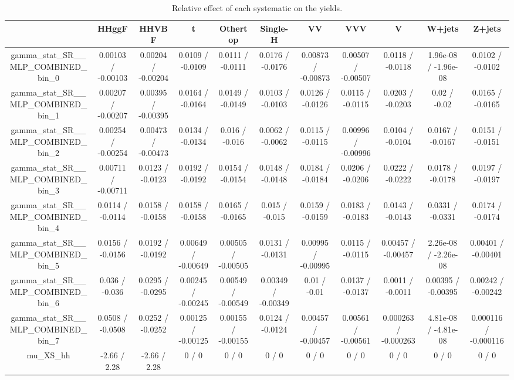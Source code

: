 \documentclass[10pt]{article}
\begin{document}
\begin{table}[htbp]
\begin{center}
\begin{tabular}{|c|c|c|c|c|c|c|c|c|c|c|}
\hline 
      & HHggF      & HHVBF      & t      & Othertop      & Single-H      & VV      & VVV      & V      & W+jets      & Z+jets \\ 
\hline 
  gamma_stat_SR__MLP_COMBINED_bin_0 & 0.00103 / -0.00103 & 0.00204 / -0.00204 & 0.0109 / -0.0109 & 0.0111 / -0.0111 & 0.0176 / -0.0176 & 0.00873 / -0.00873 & 0.00507 / -0.00507 & 0.0118 / -0.0118 & 1.96e-08 / -1.96e-08 & 0.0102 / -0.0102 \\ 
  gamma_stat_SR__MLP_COMBINED_bin_1 & 0.00207 / -0.00207 & 0.00395 / -0.00395 & 0.0164 / -0.0164 & 0.0149 / -0.0149 & 0.0103 / -0.0103 & 0.0126 / -0.0126 & 0.0115 / -0.0115 & 0.0203 / -0.0203 & 0.02 / -0.02 & 0.0165 / -0.0165 \\ 
  gamma_stat_SR__MLP_COMBINED_bin_2 & 0.00254 / -0.00254 & 0.00473 / -0.00473 & 0.0134 / -0.0134 & 0.016 / -0.016 & 0.0062 / -0.0062 & 0.0115 / -0.0115 & 0.00996 / -0.00996 & 0.0104 / -0.0104 & 0.0167 / -0.0167 & 0.0151 / -0.0151 \\ 
  gamma_stat_SR__MLP_COMBINED_bin_3 & 0.00711 / -0.00711 & 0.0123 / -0.0123 & 0.0192 / -0.0192 & 0.0154 / -0.0154 & 0.0148 / -0.0148 & 0.0184 / -0.0184 & 0.0206 / -0.0206 & 0.0222 / -0.0222 & 0.0178 / -0.0178 & 0.0197 / -0.0197 \\ 
  gamma_stat_SR__MLP_COMBINED_bin_4 & 0.0114 / -0.0114 & 0.0158 / -0.0158 & 0.0158 / -0.0158 & 0.0165 / -0.0165 & 0.015 / -0.015 & 0.0159 / -0.0159 & 0.0183 / -0.0183 & 0.0143 / -0.0143 & 0.0331 / -0.0331 & 0.0174 / -0.0174 \\ 
  gamma_stat_SR__MLP_COMBINED_bin_5 & 0.0156 / -0.0156 & 0.0192 / -0.0192 & 0.00649 / -0.00649 & 0.00505 / -0.00505 & 0.0131 / -0.0131 & 0.00995 / -0.00995 & 0.0115 / -0.0115 & 0.00457 / -0.00457 & 2.26e-08 / -2.26e-08 & 0.00401 / -0.00401 \\ 
  gamma_stat_SR__MLP_COMBINED_bin_6 & 0.036 / -0.036 & 0.0295 / -0.0295 & 0.00245 / -0.00245 & 0.00549 / -0.00549 & 0.00349 / -0.00349 & 0.01 / -0.01 & 0.0137 / -0.0137 & 0.0011 / -0.0011 & 0.00395 / -0.00395 & 0.00242 / -0.00242 \\ 
  gamma_stat_SR__MLP_COMBINED_bin_7 & 0.0508 / -0.0508 & 0.0252 / -0.0252 & 0.00125 / -0.00125 & 0.00155 / -0.00155 & 0.0124 / -0.0124 & 0.00457 / -0.00457 & 0.00561 / -0.00561 & 0.000263 / -0.000263 & 4.81e-08 / -4.81e-08 & 0.000116 / -0.000116 \\ 
  mu_XS_hh & -2.66 / 2.28 & -2.66 / 2.28 & 0 / 0 & 0 / 0 & 0 / 0 & 0 / 0 & 0 / 0 & 0 / 0 & 0 / 0 & 0 / 0 \\ 
\hline 
\end{tabular} 
\caption{Relative effect of each systematic on the yields.} 
\end{center} 
\end{table} 
\end{document}
